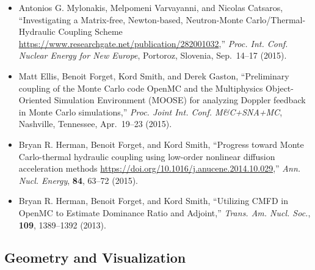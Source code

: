 \begin{itemize}
\item Antonios G. Mylonakis, Melpomeni Varvayanni, and Nicolas Catsaros,
``Investigating a Matrix-free, Newton-based, Neutron-Monte
Carlo/Thermal-Hydraulic Coupling Scheme
\url{https://www.researchgate.net/publication/282001032},''
\textit{Proc. Int. Conf. Nuclear Energy for New Europe}, Portoroz, Slovenia, Sep.\ 14--17 (2015).

\item Matt Ellis, Benoit Forget, Kord Smith, and Derek Gaston, ``Preliminary coupling
of the Monte Carlo code OpenMC and the Multiphysics Object-Oriented Simulation
Environment (MOOSE) for analyzing Doppler feedback in Monte Carlo
simulations,'' \textit{Proc. Joint Int. Conf. M\&C+SNA+MC}, Nashville, Tennessee,
Apr.\ 19--23 (2015).

\item Bryan R. Herman, Benoit Forget, and Kord Smith, ``Progress toward Monte
Carlo-thermal hydraulic coupling using low-order nonlinear diffusion
acceleration methods \url{https://doi.org/10.1016/j.anucene.2014.10.029},''
\textit{Ann. Nucl. Energy}, \textbf{84}, 63--72 (2015).

\item Bryan R. Herman, Benoit Forget, and Kord Smith, ``Utilizing CMFD in OpenMC to
Estimate Dominance Ratio and Adjoint,'' \textit{Trans. Am. Nucl. Soc.}, \textbf{109},
1389--1392 (2013).

\end{itemize}

\subsection{Geometry and Visualization}

